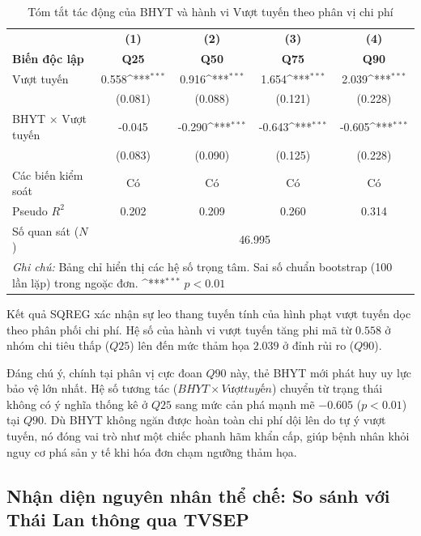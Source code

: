 \documentclass[12pt,a4paper]{article}
\begin{document}
\begin{table}[htbp]
	\centering
	\def\sym#1{\ifmmode^{#1}\else\(^{#1}\)\fi}
	\caption{Tóm tắt tác động của BHYT và hành vi Vượt tuyến theo phân vị chi phí}
	\label{tab:sqreg_summary}
	\begin{tabular}{lcccc}
		\toprule
		&\textbf{(1)}&\textbf{(2)}&\textbf{(3)}&\textbf{(4)}\\
		\textbf{Biến độc lập}&\textbf{Q25}&\textbf{Q50}&\textbf{Q75}&\textbf{Q90}\\
		\midrule
		Vượt tuyến & 0.558\sym{***} & 0.916\sym{***} & 1.654\sym{***} & 2.039\sym{***} \\
		& (0.081) & (0.088) & (0.121) & (0.228) \\
		\addlinespace
		BHYT $\times$ Vượt tuyến & -0.045 & -0.290\sym{***} & -0.643\sym{***} & -0.605\sym{***} \\
		& (0.083) & (0.090) & (0.125) & (0.228) \\
		\midrule
		Các biến kiểm soát & Có & Có & Có & Có \\
		\midrule
		Pseudo $R^2$ & 0.202 & 0.209 & 0.260 & 0.314 \\
		Số quan sát ($N$) & \multicolumn{4}{c}{46.995} \\
		\bottomrule
		\multicolumn{5}{p{13cm}}{\footnotesize \textit{Ghi chú:} Bảng chỉ hiển thị các hệ số trọng tâm. Sai số chuẩn bootstrap (100 lần lặp) trong ngoặc đơn. \sym{***} \(p<0.01\)}
	\end{tabular}
\end{table}

Kết quả SQREG xác nhận sự leo thang tuyến tính của hình phạt vượt tuyến dọc theo phân phối chi phí. Hệ số của hành vi vượt tuyến tăng phi mã từ $0.558$ ở nhóm chi tiêu thấp ($Q25$) lên đến mức thảm họa $2.039$ ở đỉnh rủi ro ($Q90$). 

Đáng chú ý, chính tại phân vị cực đoan $Q90$ này, thẻ BHYT mới phát huy uy lực bảo vệ lớn nhất. Hệ số tương tác ($BHYT \times Vượt tuyến$) chuyển từ trạng thái không có ý nghĩa thống kê ở $Q25$ sang mức cản phá mạnh mẽ $-0.605$ ($p < 0.01$) tại $Q90$. Dù BHYT không ngăn được hoàn toàn chi phí dội lên do tự ý vượt tuyến, nó đóng vai trò như một chiếc phanh hãm khẩn cấp, giúp bệnh nhân khỏi nguy cơ phá sản y tế khi hóa đơn chạm ngưỡng thảm họa.

\clearpage
\subsection{Nhận diện nguyên nhân thể chế: So sánh với Thái Lan thông qua TVSEP}
\end{document}
